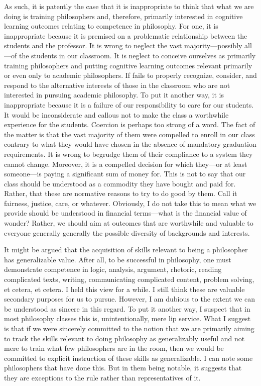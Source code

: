 \documentclass[letterpaper,notitlepage,12pt]{article}
\begin{document}
As such, it is patently the case that it is inappropriate to think that what we
are doing is training philosophers and, therefore, primarily interested in
cognitive learning outcomes relating to competence in philosophy. For one, it is
inappropriate because it is premised on a problematic relationship between the
students and the professor.
It is wrong to neglect the vast majority---possibly all---of the students in our
classroom.
It is neglect to conceive ourselves as primarily training philosophers and
putting cognitive learning outcomes relevant primarily or even only to academic
philosophers.
If fails to properly recognize, consider, and respond to the alternative
interests of those in the classroom who are not interested in pursuing academic
philosophy.
To put it another way, it is inappropriate because it is a failure of our
responsibility to care for our students.
It would be inconsiderate and callous not to make the class a worthwhile
experience for the students.
Coercion is perhaps too strong of a word.
The fact of the matter is that the vast majority of them were compelled to
enroll in our class contrary to what they would have chosen in the absence of
mandatory graduation requirements.
It is wrong to begrudge them of their compliance to a system they cannot change.
Moreover, it is a compelled decision for which they---or at least someone---is
paying a significant sum of money for.
This is not to say that our class should be understood as a commodity they have
bought and paid for.
Rather, that these are normative reasons to try to do good by them.
Call it fairness, justice, care, or whatever.
Obviously, I do not take this to mean what we provide should be understood in
financial terms---what is the financial value of wonder?
Rather, we should aim at outcomes that are worthwhile and valuable to everyone
generally generally the possible diversity of backgrounds and interests.

It might be argued that the acquisition of skills relevant to being a
philosopher has generalizable value.
After all, to be successful in philosophy, one must demonstrate competence in
logic, analysis, argument, rhetoric, reading complicated texts, writing,
communicating complicated content, problem solving, et cetera, et cetera.
I held this view for a while.
I still think these are valuable secondary purposes for us to pursue.
However, I am dubious to the extent we can be understood as sincere in this
regard.
To put it another way, I suspect that in most philosophy classes this is,
unintentionally, mere lip service.
What I suggest is that if we were sincerely committed to the notion that we are
primarily aiming to track the skills relevant to doing philosophy as
generalizably useful and not mere to train what few philosophers are in the
room, then we would be committed to explicit instruction of these skills as
generalizable.
I can note some philosophers that have done this.
But in them being notable, it suggests that they are exceptions to the rule
rather than representatives of it.
\end{document}
